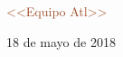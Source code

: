 \begin{titlepage}
	
	\textcolor{Sienna}{\necker \HUGE <<Equipo Atl>>}\\ %
	\vfill %
	
	
	
	{\color{RosyBrown}\fmmfamily \Huge 18 de mayo de 2018}

\end{titlepage}



